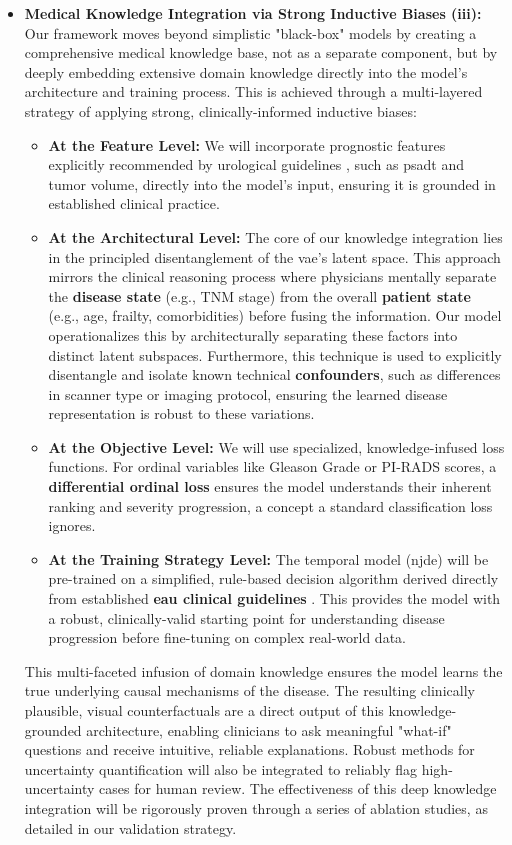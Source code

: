 \documentclass[11pt, a4paper]{article}
\begin{document}
\begin{itemize}
    \item \textbf{Medical Knowledge Integration via Strong Inductive Biases (iii):} Our framework moves beyond simplistic "black-box" models by creating a comprehensive medical knowledge base, not as a separate component, but by deeply embedding extensive domain knowledge directly into the model's architecture and training process. This is achieved through a multi-layered strategy of applying strong, clinically-informed inductive biases:
    \begin{itemize}
        \item \textbf{At the Feature Level:} We will incorporate prognostic features explicitly recommended by urological guidelines \cite{guidelines_uro_1,guidelines_uro_2} , such as \gls{psadt} and tumor volume, directly into the model's input, ensuring it is grounded in established clinical practice.
        \item \textbf{At the Architectural Level:} The core of our knowledge integration lies in the principled disentanglement of the \gls{vae}'s latent space. This approach mirrors the clinical reasoning process where physicians mentally separate the \textbf{disease state} (e.g., TNM stage) from the overall \textbf{patient state} (e.g., age, frailty, comorbidities) before fusing the information. Our model operationalizes this by architecturally separating these factors into distinct latent subspaces. Furthermore, this technique is used to explicitly disentangle and isolate known technical \textbf{confounders}, such as differences in scanner type or imaging protocol, ensuring the learned disease representation is robust to these variations.
        \item \textbf{At the Objective Level:} We will use specialized, knowledge-infused loss functions. For ordinal variables like Gleason Grade or PI-RADS scores, a \textbf{differential ordinal loss} ensures the model understands their inherent ranking and severity progression, a concept a standard classification loss ignores.
        \item \textbf{At the Training Strategy Level:} The temporal model (\gls{njde}) will be pre-trained on a simplified, rule-based decision algorithm derived directly from established \textbf{\gls{eau} clinical guidelines} \cite{guidelines_uro_1,guidelines_uro_2}. This provides the model with a robust, clinically-valid starting point for understanding disease progression before fine-tuning on complex real-world data.
    \end{itemize}
    This multi-faceted infusion of domain knowledge ensures the model learns the true underlying causal mechanisms of the disease. The resulting clinically plausible, visual counterfactuals are a direct output of this knowledge-grounded architecture, enabling clinicians to ask meaningful "what-if" questions and receive intuitive, reliable explanations. Robust methods for uncertainty quantification will also be integrated to reliably flag high-uncertainty cases for human review. The effectiveness of this deep knowledge integration will be rigorously proven through a series of ablation studies, as detailed in our validation strategy.
\end{itemize}
\end{document}
